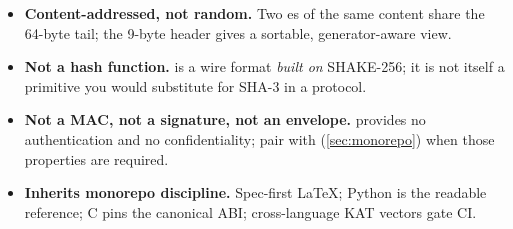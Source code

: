 \begin{calloutinfo}[At a glance]
\begin{itemize}
\item \textbf{Content-addressed, not random.} Two \tesserahash{}es of the same content share the 64-byte tail; the 9-byte header gives a sortable, generator-aware view.
\item \textbf{Not a hash function.} \tesserahash{} is a wire format \emph{built on} SHAKE-256; it is not itself a primitive you would substitute for SHA-3 in a protocol.
\item \textbf{Not a MAC, not a signature, not an envelope.} \tesserahash{} provides no authentication and no confidentiality; pair with \tesseraseal{} (\cref{sec:monorepo}) when those properties are required.
\item \textbf{Inherits monorepo discipline.} Spec-first LaTeX; Python is the readable reference; C pins the canonical ABI; cross-language KAT vectors gate CI.
\end{itemize}
\end{calloutinfo}

